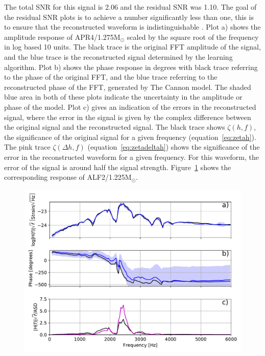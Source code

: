 The total SNR for this signal is 2.06 and the residual SNR was 1.10. The goal of the residual SNR plots is to achieve a number significantly less than one, this is to ensure that the reconstructed waveform is indistinguishable . Plot a) shows the amplitude response of APR4/1.275M$_\odot$ scaled by the square root of the frequency in log based 10 units. The black trace is the original FFT amplitude of the signal, and the blue trace is the reconstructed signal determined by the learning algorithm. Plot b) shows the phase response in degrees with black trace referring to the phase of the original FFT, and the blue trace referring to the reconstructed phase of the FFT, generated by The Cannon model. The shaded blue area in both of these plots indicate the uncertainty in the amplitude or phase of the model. Plot c) gives an indication of the errors in the reconstructed signal, where the error in the signal is given by the complex difference between the original signal and the reconstructed signal. The black trace shows $\zeta(h,f)$,  the significance of the original signal for a given frequency (equation~\ref{eq:zetah}). The pink trace $\zeta(\Delta h,f)$ (equation~\ref{eq:zetadeltah}) shows the significance of the error in the reconstructed waveform for a given frequency. For this waveform, the error of the signal is around half the signal strength. Figure~\ref{fig:CannonLogAmpPhALF2-q10-M1225} shows the corresponding response of ALF2/1.225M$_\odot$. 
\begin{figure}[H]
	\includegraphics[width=15cm]{./img/CannonLogAmpPhALF2-q10-M1225.pdf} 
	\caption[\protect]{\protect}
	\label{fig:CannonLogAmpPhALF2-q10-M1225}
\end{figure} 
